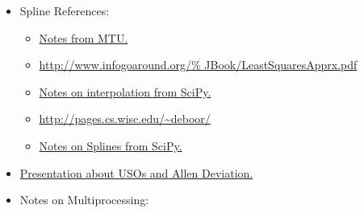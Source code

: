 \documentclass[crop=false,class=book]{standalone}
\begin{document}
\begin{itemize}[itemsep=0pt]
{                            naif/pds/data/co-s_j_e_v-spice-6-v1.0/%
                            cosp_1000/data/pck/pckinfo.txt}
                           {Table of geometry files in Cassini
                            SPICE archive. Contains .bsp files.}
                \item Spline References:
                    \begin{itemize}
                        \item \href{http://www.cs.mtu.edu/%
                                    ~shene/COURSES/cs3621/NOTES/%
                                    INT-APP/CURVE-APP-global.html}
                                       {Notes from MTU.}
                        \item \url{http://www.infogoaround.org/%
                                   JBook/LeastSquaresApprx.pdf}
                        \item \href{https://docs.scipy.org/doc/%
                                scipy-0.15.1/reference/generated/%
                                scipy.interpolate.splrep.html}
                               {Notes on interpolation from SciPy.}
                            \item \url{http://pages.cs.wisc.edu/~deboor/}
                            \item \href{https://docs.scipy.org/doc/%
                                        scipy/reference/generated/%
                                        scipy.interpolate.splrep.html}
                                       {Notes on Splines from SciPy.}
                        \end{itemize}
                        \item \href{https://websites.isae-supaero.fr/%
                                    IMG/pdf/uso-toulouse.pdf}
                                   {Presentation about USOs and Allen Deviation.}
                        \item Notes on Multiprocessing:
\end{itemize}
\end{document}
